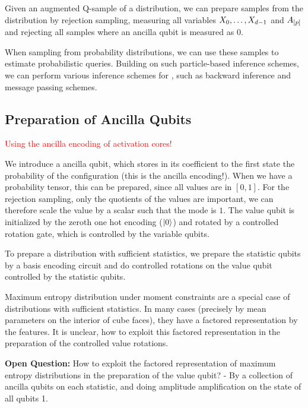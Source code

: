 \documentclass[aps,onecolumn,nofootinbib,pra]{article}
\newcommand{\red}[1]{\textcolor{red}{#1}}
\begin{document}
    Given an augmented Q-sample of a distribution, we can prepare samples from the distribution by rejection sampling, measuring all variables $X_{0},\ldots,X_{d-1}$ and $A_{[p]}$ and rejecting all samples where an ancilla qubit is measured as $0$.

    When sampling from probability distributions, we can use these samples to estimate probabilistic queries.
    Building on such particle-based inference schemes, we can perform various inference schemes for \ComputationActivationNetworks{}, such as backward inference and message passing schemes.

    \subsection{Preparation of Ancilla Qubits}

    \red{Using the ancilla encoding of activation cores!}

    We introduce a ancilla qubit, which stores in its coefficient to the first state the probability of the configuration (this is the ancilla encoding!).
    When we have a probability tensor, this can be prepared, since all values are in $[0,1]$.
    For the rejection sampling, only the quotients of the values are important, we can therefore scale the value by a scalar such that the mode is $1$.
    The value qubit is initialized by the zeroth one hot encoding ($\ket{0}$) and rotated by a controlled rotation gate, which is controlled by the variable qubits.

    To prepare a distribution with sufficient statistics, we prepare the statistic qubits by a basis encoding circuit and do controlled rotations on the value qubit controlled by the statistic qubits.

    Maximum entropy distribution under moment constraints are a special case of distributions with sufficient statistics.
    In many cases (precisely by mean parameters on the interior of cube faces), they have a factored representation by the features.
    It is unclear, how to exploit this factored representation in the preparation of the controlled value rotations.

    \textbf{Open Question:} How to exploit the factored representation of maximum entropy distributions in the preparation of the value qubit?
    - By a collection of ancilla qubits on each statistic, and doing amplitude amplification on the state of all qubits 1.
\end{document}
